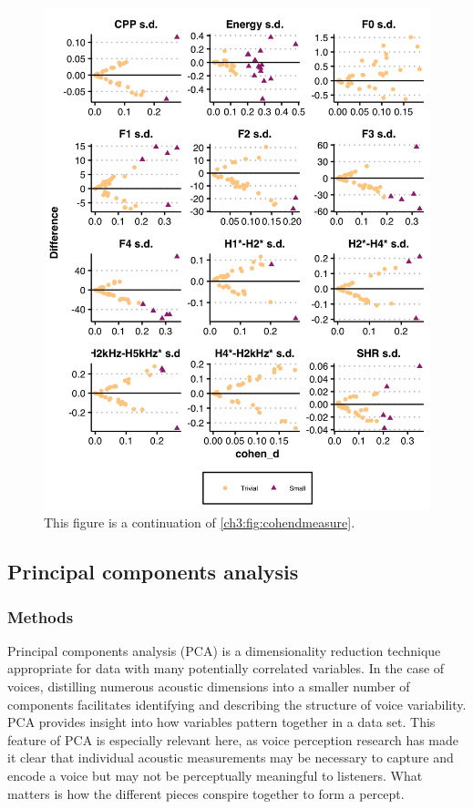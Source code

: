 \begin{figure}[htbp]
    \begin{center}
    \includegraphics[width=\linewidth]{figures/ch3_cohend_part2_5in.png} 
    \caption{This figure is a continuation of \ref{ch3:fig:cohendmeasure}.}
    \label{ch3:fig:cohendsd}
    \end{center}
\end{figure}

\subsection{Principal components analysis}\label{ch3:sec:pca}
\subsubsection{Methods}
Principal components analysis (PCA) is a dimensionality reduction technique appropriate for data with many potentially correlated variables. In the case of voices, distilling numerous acoustic dimensions into a smaller number of components facilitates identifying and describing the structure of voice variability. PCA provides insight into how variables pattern together in a data set. This feature of PCA is especially relevant here, as voice perception research has made it clear that individual acoustic measurements may be necessary to capture and encode a voice but may not be perceptually meaningful to listeners. What matters is how the different pieces conspire together to form a percept. 

